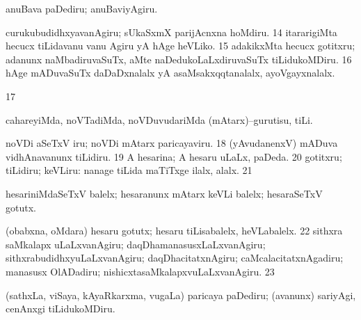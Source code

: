 {{ anuBava paDediru; anuBaviyAgiru. 

 curukubudidhxyavanAgiru; sUkaSxmX parijAcnxna hoMdiru. 
\num{14}  itararigiMta hecucx tiLidavanu \mo vanu Agiru yA hAge heVLiko. 
\num{15}  adakikxMta hecucx gotitxru; adanunx naMbadiruvaSuTx, aMte naDedukoLaLxdiruvaSuTx tiLidukoMDiru. 
\num{16}  hAge mADuvaSuTx daDaDxnalalx yA asaMsakxqqtanalalx, ayoVgayxnalalx. 
\num{17} 

 cahareyiMda, noVTadiMda, noVDuvudariMda (mAtarx)--gurutisu, tiLi.

 noVDi aSeTxV iru; noVDi mAtarx paricayaviru. 
\num{18}  (yAvudanenxV) mADuva vidhAnavanunx tiLidiru. 
\num{19}  A hesarina; A hesaru uLaLx, paDeda. 
\num{20}  gotitxru; tiLidiru; keVLiru:  nanage tiLida maTiTxge ilalx, alalx.
\num{21}  

 hesariniMdaSeTxV balelx; hesaranunx mAtarx keVLi balelx; hesaraSeTxV gotutx. 

 (obabxna, oMdara) hesaru gotutx; hesaru tiLisabalelx, heVLabalelx. 
\num{22}  sithxra saMkalapx uLaLxvanAgiru; daqDhamanasusxLaLxvanAgiru; sithxrabudidhxyuLaLxvanAgiru; daqDhacitatxnAgiru; caMcalacitatxnAgadiru; manasusx OlADadiru; nishicxtasaMkalapxvuLaLxvanAgiru. 
\num{23}  

 (sathxLa, viSaya, kAyaRkarxma, \mo vugaLa) paricaya paDediru; (avanunx) sariyAgi, cenAnxgi tiLidukoMDiru. 

}}
